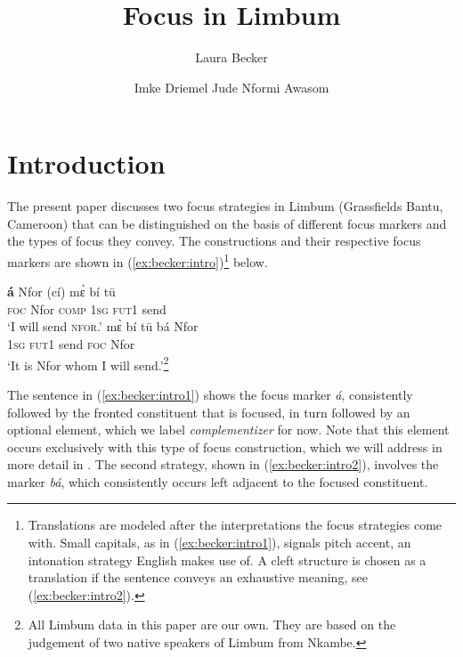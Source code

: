 \documentclass[output=paper,
modfonts
]{langscibook}
\title{Focus in Limbum}
\author{%
Laura Becker\affiliation{Leipzig University}\and 
 Imke Driemel\affiliation{Leipzig University}\lastand 
 Jude Nformi Awasom\affiliation{Leipzig University}
}
\begin{document}
\maketitle

\section{Introduction}\largerpage
The present paper discusses two focus strategies in Limbum (Grassfields Bantu, Cameroon) that can be distinguished on the basis of different focus markers and the types of focus they convey. The constructions and their respective focus markers are shown in (\ref{ex:becker:intro})\footnote{Translations are modeled after the interpretations the focus strategies come with. Small capitals, as in (\ref{ex:becker:intro1}), signals pitch accent, an intonation strategy English makes use of. A cleft structure is chosen as a translation if the sentence conveys an exhaustive meaning, see (\ref{ex:becker:intro2}).} below.

\ea \label{ex:becker:intro}
\ea \label{ex:becker:intro1}
\gll \textbf{á}  Nfor (cí) m\`ɛ bí t\=u \\
\textsc{foc} Nfor \textsc{comp} \textsc{1sg} \textsc{fut1} send \\
\glt `I will send \textsc{\MakeLowercase{NFOR}}.'
\ex \label{ex:becker:intro2}
\gll m\`ɛ bí t\=u bá Nfor\\
\textsc{1sg} \textsc{fut1} send \textsc{foc} Nfor\\
\glt `It is Nfor whom I will send.'\footnote{All Limbum data in this paper are our own. They are based on the judgement of two native speakers of Limbum from Nkambe.}
\z
\z 


\noindent
The sentence in (\ref{ex:becker:intro1}) shows the focus marker \textit{á}, consistently followed by the fronted constituent that is focused, in turn followed by an optional element, which we label \textit{complementizer} for now. Note that this element occurs exclusively with this type of focus construction, which we will address in more detail in . The second strategy, shown in (\ref{ex:becker:intro2}), involves the marker \textit{bá}, which consistently occurs left adjacent to the focused constituent.
 
\end{document}
